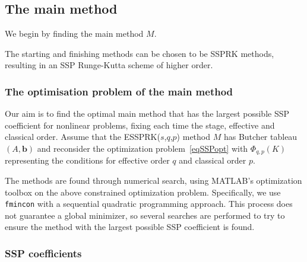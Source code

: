 \subsection{The main method}\label{subsection3.1}
We begin by finding the main method $M$.

The starting and finishing methods can be chosen to be SSPRK methods, resulting
in an SSP Runge-Kutta scheme of higher order.


\subsubsection{The optimisation problem of the main method}\label{subsection3.1.1}

\qquad Our aim is to find the optimal main method that has the largest possible SSP coefficient for nonlinear problems, fixing each time the stage, effective and classical order. 
Assume that the ESSPRK(\( s \),\( q \),\( p \)) method \( M \) has Butcher tableau  \( (A, \bm{b}) \)
and reconsider the optimization problem~\eqref{eqSSPopt}
with \( \Phi_{q,p}(K) \) representing  the conditions for effective order $q$ and classical order $p$.

The methods are found through numerical search, using
\textsc{MATLAB}'s optimization toolbox on the above constrained
optimization problem.  Specifically, we use \verb"fmincon" with a
sequential quadratic programming approach.
This process does not guarantee a global minimizer, so several
searches are performed to try to ensure the method with the largest possible SSP coefficient is found.


\subsubsection{SSP coefficients}\label{subsection3.1.2}

